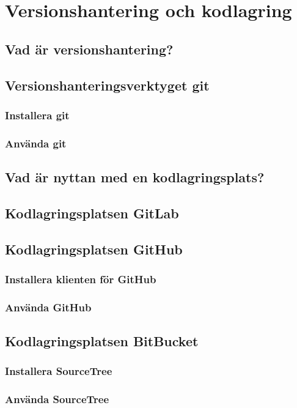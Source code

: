 

\chapter{Versionshantering och kodlagring}

\section{Vad är versionshantering?}

\section{Versionshanteringsverktyget git}

\subsection{Installera git}

\subsection{Använda git}

\section{Vad är nyttan med en kodlagringsplats?}

\section{Kodlagringsplatsen GitLab}


\section{Kodlagringsplatsen GitHub}

\subsection{Installera klienten för GitHub}

\subsection{Använda GitHub}


\section{Kodlagringsplatsen BitBucket}

\subsection{Installera SourceTree}

\subsection{Använda SourceTree}
